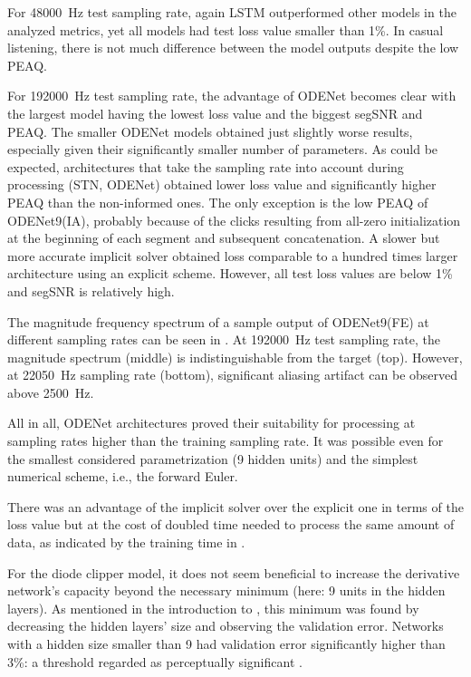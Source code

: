 For \SI{48000}{Hz} test sampling rate, again \ac{LSTM} outperformed other models in the analyzed metrics, yet all models had test loss value smaller than 1\%. In casual listening, there is not much difference between the model outputs despite the low \ac{PEAQ}.

For \SI{192000}{Hz} test sampling rate, the advantage of ODENet becomes clear with the largest model having the lowest loss value and the biggest \ac{segSNR} and \ac{PEAQ}. The smaller ODENet models obtained just slightly worse results, especially given their significantly smaller number of parameters. As could be expected, architectures that take the sampling rate into account during processing (\ac{STN}, ODENet) obtained lower loss value and significantly higher \ac{PEAQ} than the non-informed ones. The only exception is the low \ac{PEAQ} of ODENet9(IA), probably because of the clicks resulting from all-zero initialization at the beginning of each segment and subsequent concatenation. A slower but more accurate implicit solver obtained loss comparable to a hundred times larger architecture using an explicit scheme. However, all test loss values are below 1\% and \ac{segSNR} is relatively high.

The magnitude frequency spectrum of a sample output of ODENet9(FE) at different sampling rates can be seen in . At \SI{192000}{Hz} test sampling rate, the magnitude spectrum (middle) is indistinguishable from the target (top). However, at \SI{22050}{Hz} sampling rate (bottom), significant aliasing artifact can be observed above \SI{2500}{Hz}.

All in all, ODENet architectures proved their suitability for processing at sampling rates higher than the training sampling rate. It was possible even for the smallest considered parametrization (9 hidden units) and the simplest numerical scheme, i.e., the forward Euler. 

There was an advantage of the implicit solver over the explicit one in terms of the loss value but at the cost of doubled time needed to process the same amount of data, as indicated by the training time in . 

For the diode clipper model, it does not seem beneficial to increase the derivative network's capacity beyond the necessary minimum (here: 9 units in the hidden layers). As mentioned in the introduction to , this minimum was found by decreasing the hidden layers' size and observing the validation error. Networks with a hidden size smaller than 9 had validation error significantly higher than 3\%: a threshold regarded as perceptually significant \cite{Wright2020}.

